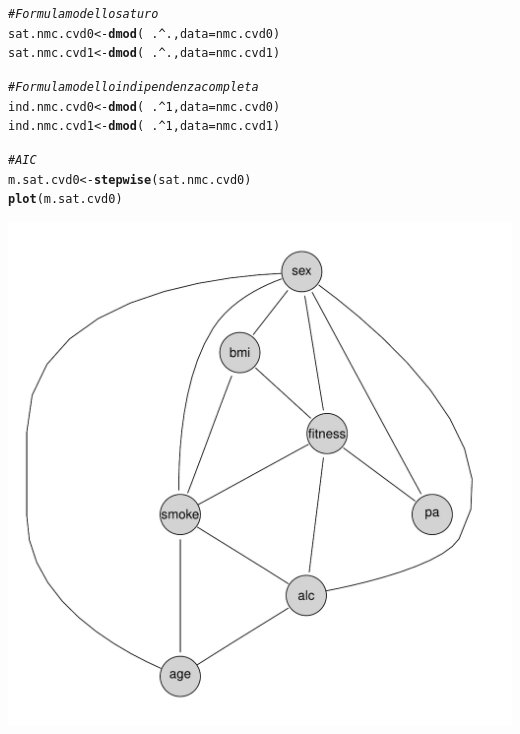 \documentclass{article}\usepackage[]{graphicx}\usepackage[]{xcolor}
\makeatletter
\def\maxwidth{ %
  \ifdim\Gin@nat@width>\linewidth
    \linewidth
  \else
    \Gin@nat@width
  \fi
}
\newcommand{\hlnum}[1]{\textcolor[rgb]{0.686,0.059,0.569}{#1}}%
\newcommand{\hlcom}[1]{\textcolor[rgb]{0.678,0.584,0.686}{\textit{#1}}}%
\newcommand{\hlopt}[1]{\textcolor[rgb]{0,0,0}{#1}}%
\newcommand{\hlstd}[1]{\textcolor[rgb]{0.345,0.345,0.345}{#1}}%
\newcommand{\hlkwb}[1]{\textcolor[rgb]{0.69,0.353,0.396}{#1}}%
\newcommand{\hlkwc}[1]{\textcolor[rgb]{0.333,0.667,0.333}{#1}}%
\newcommand{\hlkwd}[1]{\textcolor[rgb]{0.737,0.353,0.396}{\textbf{#1}}}%
\newenvironment{kframe}{%
 \def\at@end@of@kframe{}%
 \ifinner\ifhmode%
  \def\at@end@of@kframe{\end{minipage}}%
  \begin{minipage}{\columnwidth}%
 \fi\fi%
 \def\FrameCommand##1{\hskip\@totalleftmargin \hskip-\fboxsep
 \colorbox{shadecolor}{##1}\hskip-\fboxsep
     \hskip-\linewidth \hskip-\@totalleftmargin \hskip\columnwidth}%
 \MakeFramed {\advance\hsize-\width
   \@totalleftmargin\z@ \linewidth\hsize
   \@setminipage}}%
 {\par\unskip\endMakeFramed%
 \at@end@of@kframe}
\newenvironment{knitrout}{}{} %
\makeatother
\begin{document}
\begin{knitrout}
\color{fgcolor}\begin{kframe}
\begin{alltt}
\hlcom{#Formula modello saturo}
\hlstd{sat.nmc.cvd0} \hlkwb{<-} \hlkwd{dmod}\hlstd{(}\hlopt{~}\hlstd{.}\hlopt{^}\hlstd{.,} \hlkwc{data}\hlstd{=nmc.cvd0)}
\hlstd{sat.nmc.cvd1} \hlkwb{<-} \hlkwd{dmod}\hlstd{(}\hlopt{~}\hlstd{.}\hlopt{^}\hlstd{.,} \hlkwc{data}\hlstd{=nmc.cvd1)}
\end{alltt}
\end{kframe}
\end{knitrout}
\begin{knitrout}
\color{fgcolor}\begin{kframe}
\begin{alltt}
\hlcom{#Formula modello indipendenza completa}
\hlstd{ind.nmc.cvd0} \hlkwb{<-} \hlkwd{dmod}\hlstd{(}\hlopt{~}\hlstd{.}\hlopt{^}\hlnum{1}\hlstd{,} \hlkwc{data}\hlstd{=nmc.cvd0)}
\hlstd{ind.nmc.cvd1} \hlkwb{<-} \hlkwd{dmod}\hlstd{(}\hlopt{~}\hlstd{.}\hlopt{^}\hlnum{1}\hlstd{,} \hlkwc{data}\hlstd{=nmc.cvd1)}
\end{alltt}
\end{kframe}
\end{knitrout}
    
\begin{knitrout}
\color{fgcolor}\begin{kframe}
\begin{alltt}
\hlcom{#AIC}
\hlstd{m.sat.cvd0} \hlkwb{<-} \hlkwd{stepwise}\hlstd{(sat.nmc.cvd0)}
\hlkwd{plot}\hlstd{(m.sat.cvd0)}
\end{alltt}
\end{kframe}
\includegraphics[width=\maxwidth]{figure/Grafo_AIC_CVD0-1} 
\end{knitrout}
    
\end{document}
